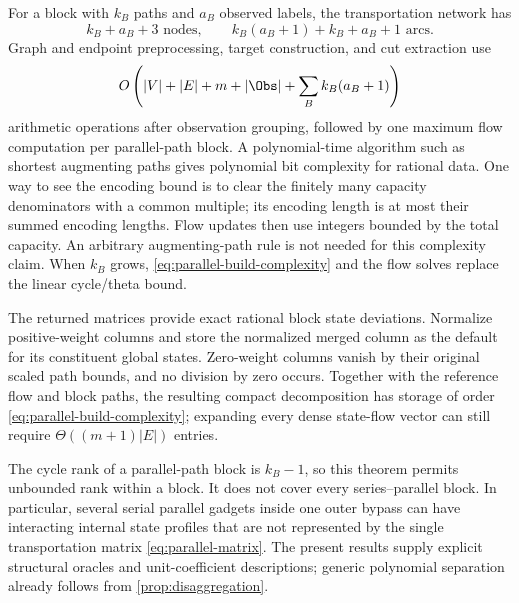 For a block with $k_B$ paths and $a_B$ observed labels, the transportation
network has
\begin{equation}\label{eq:transport-size}
 k_B+a_B+3\text{ nodes},\qquad
 k_B(a_B+1)+k_B+a_B+1\text{ arcs}.
\end{equation}
Graph and endpoint preprocessing, target construction, and cut extraction
use
\begin{equation}\label{eq:parallel-build-complexity}
 O\left(|V|+|E|+m+|\Obs|+\sum_B k_B(a_B+1)\right)
\end{equation}
arithmetic operations after observation grouping, followed by one maximum
flow computation per parallel-path block. A polynomial-time algorithm
such as shortest augmenting paths \citep{EdmondsKarp1972} gives polynomial
bit complexity for rational data. One way to see the encoding bound is
to clear the finitely many capacity denominators with a common multiple;
its encoding length is at most their summed encoding lengths. Flow
updates then use integers bounded by the total capacity. An arbitrary
augmenting-path rule is not needed for this complexity claim. When
$k_B$ grows, \eqref{eq:parallel-build-complexity} and the flow solves
replace the linear cycle/theta bound.

The returned matrices provide exact rational block state deviations.
Normalize positive-weight columns and store the normalized merged column
as the default for its constituent global states. Zero-weight columns
vanish by their original scaled path bounds, and no division by zero
occurs. Together with the reference flow and block paths, the resulting
compact decomposition has storage of order
\eqref{eq:parallel-build-complexity}; expanding every dense state-flow
vector can still require $\Theta((m+1)|E|)$ entries.

The cycle rank of a parallel-path block is $k_B-1$, so this theorem
permits unbounded rank within a block. It does not cover every
series--parallel block. In particular, several serial parallel gadgets
inside one outer bypass can have interacting internal state profiles
that are not represented by the single transportation matrix
\eqref{eq:parallel-matrix}. The present results supply explicit
structural oracles and unit-coefficient descriptions; generic polynomial
separation already follows from \cref{prop:disaggregation}.
